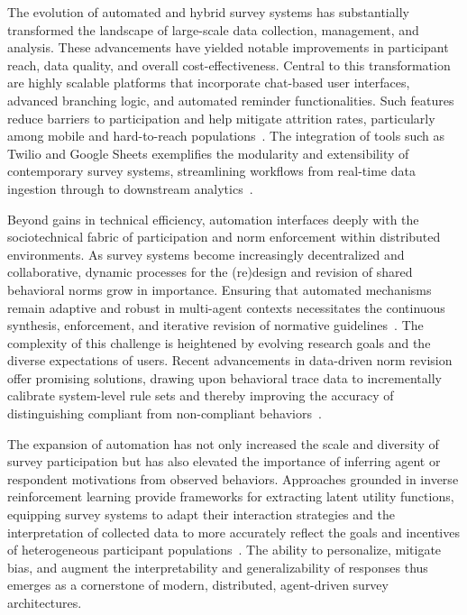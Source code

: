The evolution of automated and hybrid survey systems has substantially transformed the landscape of large-scale data collection, management, and analysis. These advancements have yielded notable improvements in participant reach, data quality, and overall cost-effectiveness. Central to this transformation are highly scalable platforms that incorporate chat-based user interfaces, advanced branching logic, and automated reminder functionalities. Such features reduce barriers to participation and help mitigate attrition rates, particularly among mobile and hard-to-reach populations~\cite{ref117}. The integration of tools such as Twilio and Google Sheets exemplifies the modularity and extensibility of contemporary survey systems, streamlining workflows from real-time data ingestion through to downstream analytics~\cite{ref117}.

Beyond gains in technical efficiency, automation interfaces deeply with the sociotechnical fabric of participation and norm enforcement within distributed environments. As survey systems become increasingly decentralized and collaborative, dynamic processes for the (re)design and revision of shared behavioral norms grow in importance. Ensuring that automated mechanisms remain adaptive and robust in multi-agent contexts necessitates the continuous synthesis, enforcement, and iterative revision of normative guidelines~\cite{ref17}. The complexity of this challenge is heightened by evolving research goals and the diverse expectations of users. Recent advancements in data-driven norm revision offer promising solutions, drawing upon behavioral trace data to incrementally calibrate system-level rule sets and thereby improving the accuracy of distinguishing compliant from non-compliant behaviors~\cite{ref17}.

The expansion of automation has not only increased the scale and diversity of survey participation but has also elevated the importance of inferring agent or respondent motivations from observed behaviors. Approaches grounded in inverse reinforcement learning provide frameworks for extracting latent utility functions, equipping survey systems to adapt their interaction strategies and the interpretation of collected data to more accurately reflect the goals and incentives of heterogeneous participant populations~\cite{ref18}. The ability to personalize, mitigate bias, and augment the interpretability and generalizability of responses thus emerges as a cornerstone of modern, distributed, agent-driven survey architectures.


